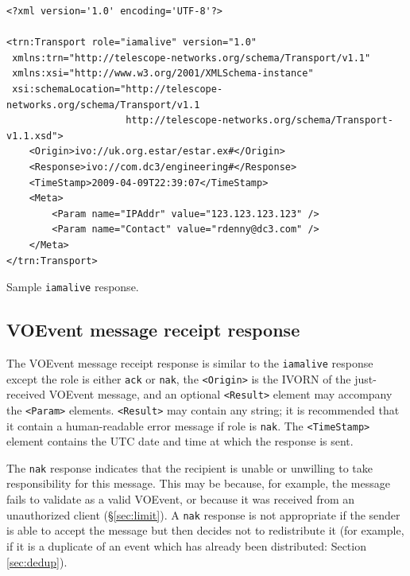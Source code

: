 \documentclass[a4paper,11pt]{ivoa}
\begin{document}
\begin{listing*}
\begin{verbatim}
<?xml version='1.0' encoding='UTF-8'?>

<trn:Transport role="iamalive" version="1.0"
 xmlns:trn="http://telescope-networks.org/schema/Transport/v1.1"
 xmlns:xsi="http://www.w3.org/2001/XMLSchema-instance"
 xsi:schemaLocation="http://telescope-networks.org/schema/Transport/v1.1
                     http://telescope-networks.org/schema/Transport-v1.1.xsd">
    <Origin>ivo://uk.org.estar/estar.ex#</Origin>
    <Response>ivo://com.dc3/engineering#</Response>
    <TimeStamp>2009-04-09T22:39:07</TimeStamp>
    <Meta>
        <Param name="IPAddr" value="123.123.123.123" />
        <Param name="Contact" value="rdenny@dc3.com" />
    </Meta>
</trn:Transport>
\end{verbatim}
\caption{Sample \texttt{iamalive} response.}
\label{lst:iamaliveresponse}
\end{listing*}

\subsection{VOEvent message receipt response}
\label{sec:transport:ack}

The VOEvent message receipt response is similar to the \texttt{iamalive}
response except the role is either \texttt{ack} or \texttt{nak}, the
\texttt{<Origin>} is the IVORN of the just-received VOEvent message, and an
optional \texttt{<Result>} element may accompany the \texttt{<Param>}
elements. \texttt{<Result>} may contain any string; it is recommended that it
contain a human-readable error message if role is \texttt{nak}. The
\texttt{<TimeStamp>} element contains the UTC date and time at which the
response is sent.

The \texttt{nak} response indicates that the recipient is unable or unwilling
to take responsibility for this message. This may be because, for example, the
message fails to validate as a valid VOEvent, or because it was received from
an unauthorized client (\S\ref{sec:limit}). A \texttt{nak} response is not
appropriate if the sender is able to accept the message but then decides not
to redistribute it (for example, if it is a duplicate of an event which has
already been distributed: Section \ref{sec:dedup}).
\end{document}
